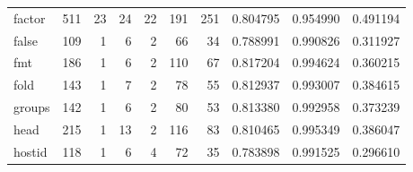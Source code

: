 \begin{longtable}{lrrrrrrrrr}
factor    &                    511 &                                 23 &                                24 &                               22 &                               191 &                             251 &                                0.804795 &                               0.954990 &                             0.491194 \\
false     &                    109 &                                  1 &                                 6 &                                2 &                                66 &                              34 &                                0.788991 &                               0.990826 &                             0.311927 \\
fmt       &                    186 &                                  1 &                                 6 &                                2 &                               110 &                              67 &                                0.817204 &                               0.994624 &                             0.360215 \\
fold      &                    143 &                                  1 &                                 7 &                                2 &                                78 &                              55 &                                0.812937 &                               0.993007 &                             0.384615 \\
groups    &                    142 &                                  1 &                                 6 &                                2 &                                80 &                              53 &                                0.813380 &                               0.992958 &                             0.373239 \\
head      &                    215 &                                  1 &                                13 &                                2 &                               116 &                              83 &                                0.810465 &                               0.995349 &                             0.386047 \\
hostid    &                    118 &                                  1 &                                 6 &                                4 &                                72 &                              35 &                                0.783898 &                               0.991525 &                             0.296610 \\

\end{longtable}
